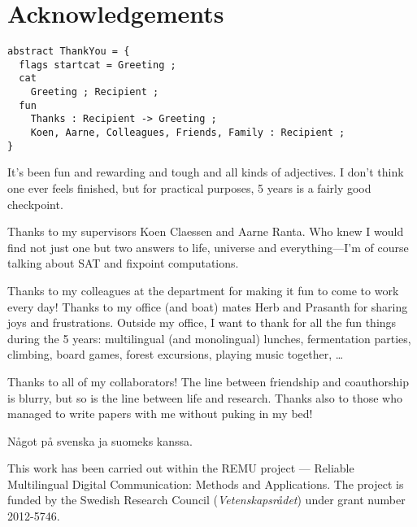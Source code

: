 \chapter*{Acknowledgements}\label{chp:acknowledgements}


\begin{verbatim}
abstract ThankYou = {
  flags startcat = Greeting ;
  cat 
    Greeting ; Recipient ;
  fun
    Thanks : Recipient -> Greeting ;
    Koen, Aarne, Colleagues, Friends, Family : Recipient ;
}
\end{verbatim}


It's been fun and rewarding and tough and all kinds of
adjectives. %
I don't think one ever feels finished, but for practical purposes, 5
years is a fairly good checkpoint.

Thanks to my supervisors Koen Claessen and Aarne Ranta. Who knew I
would find not just one but two answers to life, universe and
everything---I'm of course talking about SAT and fixpoint
computations.

Thanks to my colleagues at the department for making it fun to come to
work every day! Thanks to my office (and boat) mates Herb and Prasanth
for sharing joys and frustrations. Outside my office, I want to thank
 for all the fun things during the 5 years:
multilingual (and monolingual) lunches, fermentation parties,
climbing, board games, forest excursions, playing music together,
\dots

Thanks to all of my collaborators! The line between friendship and
coauthorship is blurry, but so is the line between life and
research. Thanks also to those who managed to write papers with me
without puking in my bed!

Något på svenska ja suomeks kanssa.

\vfill\noindent
This work has been carried out within the REMU project — Reliable Multilingual Digital Communication: Methods and Applications.
The project is funded by the Swedish Research Council (\emph{Vetenskapsrådet}) under grant number 2012-5746.
